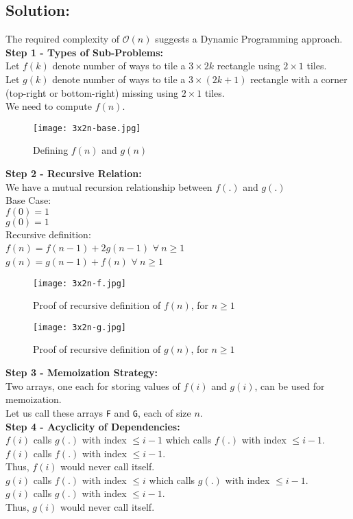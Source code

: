 \documentclass[11pt, fleqn]{article}
\begin{document}
\subsection*{Solution:}

The required complexity of $\mathcal{O}(n)$ suggests a Dynamic Programming approach. \\

\textbf{Step 1 - Types of Sub-Problems:}\\
Let $f(k)$ denote number of ways to tile a $3 \times 2k$ rectangle using $2 \times 1$ tiles.\\
Let $g(k)$ denote number of ways to tile a $3 \times (2k+1)$ rectangle with a corner (top-right or bottom-right) missing using $2 \times 1$ tiles.\\
We need to compute $f(n)$.
\begin{figure}[H]
    \centering
    \texttt{[image: 3x2n-base.jpg]}
    \caption{Defining $f(n)$ and $g(n)$}
\end{figure}


\textbf{Step 2 - Recursive Relation:}\\
We have a mutual recursion relationship between $f(.)$ and $g(.)$ \\
Base Case: \\
$f(0) = 1$\\
$g(0) = 1$\\
Recursive definition: \\
$f(n) = f(n-1) + 2g(n-1)$ $\forall \ n \ge 1$\\
$g(n) = g(n-1) + f(n)$ $\forall \ n \ge 1$

\begin{figure}[H]
    \centering
    \texttt{[image: 3x2n-f.jpg]}
    \caption{Proof of recursive definition of $f(n)$, for $n \ge 1$}
\end{figure}
\begin{figure}[H]
    \centering
    \texttt{[image: 3x2n-g.jpg]}
    \caption{Proof of recursive definition of $g(n)$, for $n \ge 1$}
\end{figure}

\textbf{Step 3 - Memoization Strategy:}\\
Two arrays, one each for storing values of $f(i)$ and $g(i)$, can be used for memoization.\\
Let us call these arrays \texttt{F} and \texttt{G}, each of size $n$.\\

\textbf{Step 4 - Acyclicity of Dependencies:}\\
$f(i)$ calls $g(.)$ with index $\le i-1$ which calls $f(.)$ with index $\le i-1$.\\
$f(i)$ calls $f(.)$ with index $\le i-1$.\\
Thus, $f(i)$ would never call itself.\\
$g(i)$ calls $f(.)$ with index $\le i$ which calls $g(.)$ with index $\le i-1$.\\
$g(i)$ calls $g(.)$ with index $\le i-1$.\\
Thus, $g(i)$ would never call itself.\\
\end{document}
